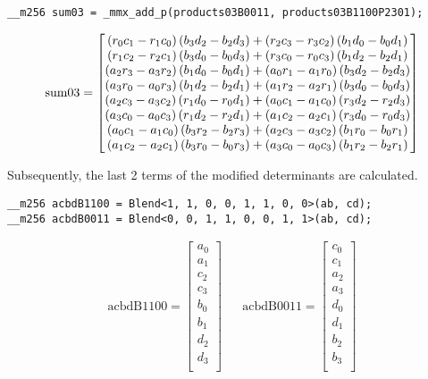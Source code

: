 \begin{verbatim}
__m256 sum03 = _mmx_add_p(products03B0011, products03B1100P2301);
\end{verbatim} 
\begin{align*}
\mathrm{sum03} 
=
\begin{bmatrix}
  \left(r_0c_1 - r_1c_0\right)\left(b_3d_2 - b_2d_3\right) 
+ \left(r_2c_3 - r_3c_2\right)\left(b_1d_0 - b_0d_1\right)\\
  \left(r_1c_2 - r_2c_1\right)\left(b_3d_0 - b_0d_3\right)
+ \left(r_3c_0 - r_0c_3\right)\left(b_1d_2 - b_2d_1\right)\\
  \left(a_2r_3 - a_3r_2\right)\left(b_1d_0 - b_0d_1\right)
+ \left(a_0r_1 - a_1r_0\right)\left(b_3d_2 - b_2d_3\right)\\
  \left(a_3r_0 - a_0r_3\right)\left(b_1d_2 - b_2d_1\right)
+ \left(a_1r_2 - a_2r_1\right)\left(b_3d_0 - b_0d_3\right)\\
  \left(a_2c_3 - a_3c_2\right)\left(r_1d_0 - r_0d_1\right)
+ \left(a_0c_1 - a_1c_0\right)\left(r_3d_2 - r_2d_3\right)\\
  \left(a_3c_0 - a_0c_3\right)\left(r_1d_2 - r_2d_1\right)
+ \left(a_1c_2 - a_2c_1\right)\left(r_3d_0 - r_0d_3\right)\\
  \left(a_0c_1 - a_1c_0\right)\left(b_3r_2 - b_2r_3\right)
+ \left(a_2c_3 - a_3c_2\right)\left(b_1r_0 - b_0r_1\right)\\
  \left(a_1c_2 - a_2c_1\right)\left(b_3r_0 - b_0r_3\right)
+ \left(a_3c_0 - a_0c_3\right)\left(b_1r_2 - b_2r_1\right)\\
\end{bmatrix}
\end{align*}




Subsequently, the last 2 terms of the modified determinants are calculated.
\begin{verbatim}
__m256 acbdB1100 = Blend<1, 1, 0, 0, 1, 1, 0, 0>(ab, cd);
__m256 acbdB0011 = Blend<0, 0, 1, 1, 0, 0, 1, 1>(ab, cd);
\end{verbatim} 
\begin{align*}
\mathrm{acbdB1100} 
=
\begin{bmatrix}
a_0\\
a_1\\
c_2\\
c_3\\
b_0\\
b_1\\
d_2\\
d_3\\
\end{bmatrix}
&&
\mathrm{acbdB0011} 
=
\begin{bmatrix}
c_0\\
c_1\\
a_2\\
a_3\\
d_0\\
d_1\\
b_2\\
b_3\\
\end{bmatrix}
\end{align*}


